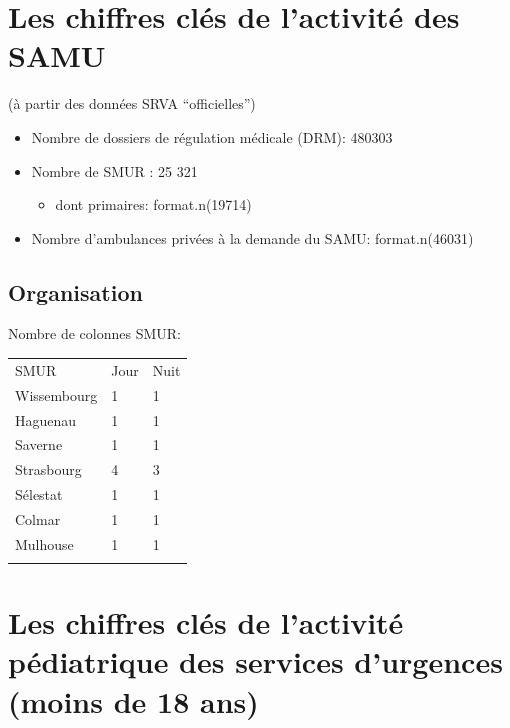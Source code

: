 \documentclass[]{article}
\begin{document}
\section{Les chiffres clés de l'activité des
SAMU}\label{les-chiffres-cles-de-lactivite-des-samu}

(à partir des données SRVA ``officielles'')

\begin{itemize}
\itemsep1pt\parskip0pt
\item
  Nombre de dossiers de régulation médicale (DRM): 480303
\item
  Nombre de SMUR : 25 321

  \begin{itemize}
  \itemsep1pt\parskip0pt
  \item
    dont primaires: format.n(19714)
  \end{itemize}
\item
  Nombre d'ambulances privées à la demande du SAMU: format.n(46031)
\end{itemize}

\subsection{Organisation}\label{organisation}

Nombre de colonnes SMUR:

\begin{longtable}[c]{@{}lll@{}}
\toprule\addlinespace
SMUR & Jour & Nuit
\\\addlinespace
\midrule\endhead
Wissembourg & 1 & 1
\\\addlinespace
Haguenau & 1 & 1
\\\addlinespace
Saverne & 1 & 1
\\\addlinespace
Strasbourg & 4 & 3
\\\addlinespace
Sélestat & 1 & 1
\\\addlinespace
Colmar & 1 & 1
\\\addlinespace
Mulhouse & 1 & 1
\\\addlinespace
\bottomrule
\end{longtable}

\section{Les chiffres clés de l'activité pédiatrique des services
d'urgences (moins de 18
ans)}\label{les-chiffres-cles-de-lactivite-pediatrique-des-services-durgences-moins-de-18-ans}
\end{document}
